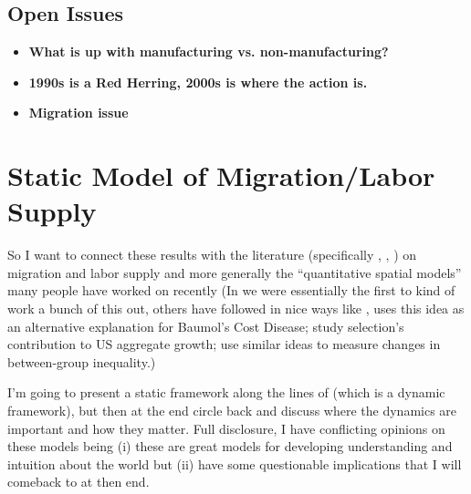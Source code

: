 \documentclass[pdftex,12pt]{article}
\begin{document}
\subsection{Open Issues}

\begin{itemize}
\item \textbf{What is up with manufacturing vs. non-manufacturing?}

\item \textbf{1990s is a Red Herring, 2000s is where the action is.}

\item \textbf{Migration issue}
\end{itemize}

\newpage

\section{Static Model of Migration/Labor Supply}

\medskip
\noindent So I want to connect these results with the literature (specifically \citet{artucc2010trade}, \citet{caliendo2015trade}, \citet{galle2015slicing}) on migration and labor supply and more generally the ``quantitative spatial models'' many people have worked on recently (In \citet{lagakos2013selection} we were essentially the first to kind of work a bunch of this out, others have followed in nice ways like \citet{young2013inequality}, \citet{young2014structural} uses this idea as an alternative explanation for Baumol's Cost Disease; \citet{hsieh2013allocation} study selection's contribution to US aggregate growth; \citet{burstein2015accounting} use similar ideas to measure changes in between-group inequality.)


\medskip
\noindent I'm going to present a static framework along the lines of \citet{caliendo2015trade} (which is a dynamic framework), but then at the end circle back and discuss where the dynamics are important and how they matter. Full disclosure, I have conflicting opinions on these models being (i) these are great models for developing understanding and intuition about the world but (ii) have some questionable implications that I will comeback to at then end.
\end{document}
